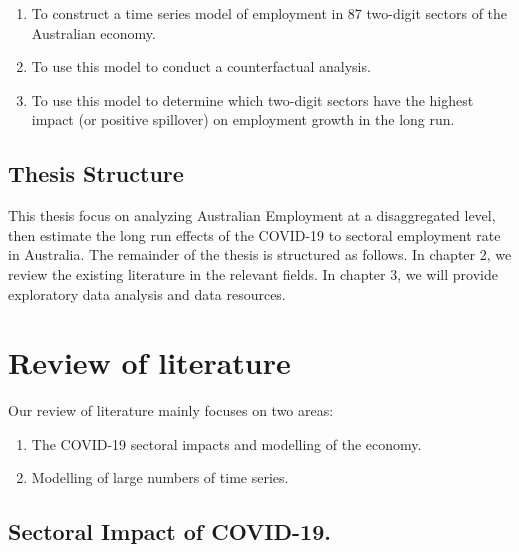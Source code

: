 \documentclass{monashthesis}
\begin{document}
\begin{enumerate}
\def\labelenumi{\arabic{enumi}.}
\item
  To construct a time series model of employment in 87 two-digit sectors of the Australian economy.
\item
  To use this model to conduct a counterfactual analysis.
\item
  To use this model to determine which two-digit sectors have the highest impact (or positive spillover) on employment growth in the long run.
\end{enumerate}

\hypertarget{thesis-structure}{%
\section{Thesis Structure}\label{thesis-structure}}

This thesis focus on analyzing Australian Employment at a disaggregated level, then estimate the long run effects of the COVID-19 to sectoral employment rate in Australia. The remainder of the thesis is structured as follows. In chapter 2, we review the existing literature in the relevant fields. In chapter 3, we will provide exploratory data analysis and data resources.

\hypertarget{review-of-literature}{%
\chapter{Review of literature}\label{review-of-literature}}

Our review of literature mainly focuses on two areas:

\begin{enumerate}
\def\labelenumi{\arabic{enumi}.}
\item
  The COVID-19 sectoral impacts and modelling of the economy.
\item
  Modelling of large numbers of time series.
\end{enumerate}

\hypertarget{sectoral-impact-of-covid-19.}{%
\section{Sectoral Impact of COVID-19.}\label{sectoral-impact-of-covid-19.}}
\end{document}
